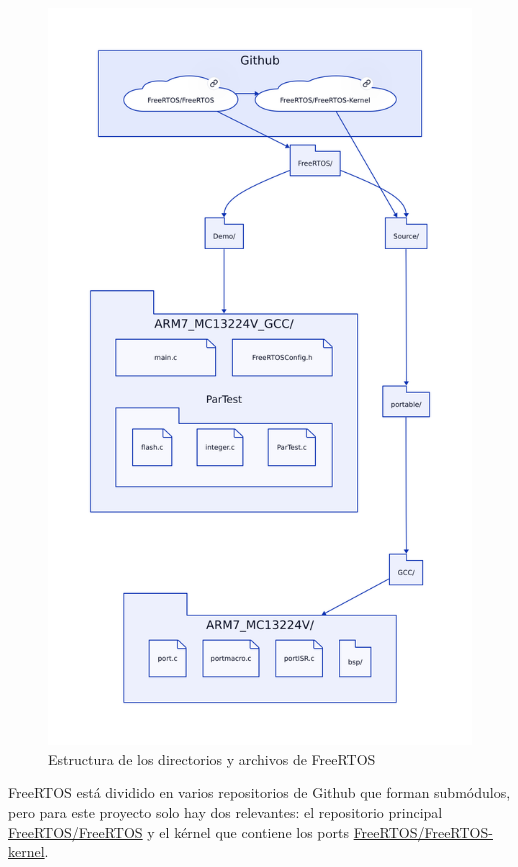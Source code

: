 \begin{figure}[!ht]
\centering
\includegraphics[width=\textwidth]{img/carpetasFreeRTOS.png}
\caption{Estructura de los directorios y archivos de FreeRTOS}
\label{fig:DirsFreeRTOS}
\end{figure}

FreeRTOS está dividido en varios repositorios de Github que forman submódulos, pero para este proyecto solo hay dos relevantes: el repositorio principal \href{https://github.com/FreeRTOS/FreeRTOS}{FreeRTOS/FreeRTOS} y el kérnel que contiene los ports \href{https://github.com/FreeRTOS/FreeRTOS-kernel}{FreeRTOS/FreeRTOS-kernel}.

